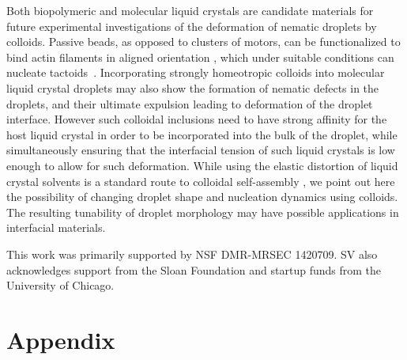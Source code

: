 \documentclass[%
 aip,
 amsmath,amssymb,
 reprint,%
]{revtex4-1}
\begin{document}
Both biopolymeric and molecular liquid crystals are candidate materials for future experimental investigations of the deformation of nematic droplets by colloids. Passive beads, as opposed to clusters of motors, can be functionalized to bind actin filaments in aligned orientation \cite{Stachowiak2012}, which under suitable conditions can nucleate tactoids~\cite{Weirich17}. Incorporating strongly homeotropic colloids into molecular liquid crystal droplets may also show the formation of nematic defects in the droplets, and their ultimate expulsion leading to deformation of the droplet interface. However such colloidal inclusions need to have strong affinity for the host liquid crystal in order to be incorporated into the bulk of the droplet, while simultaneously ensuring that the interfacial tension of such liquid crystals is low enough to allow for such deformation. While using the elastic distortion of liquid crystal solvents is a standard route to colloidal self-assembly \cite{Luo2018}, we point out here the possibility of changing droplet shape and nucleation dynamics using colloids. The resulting tunability of droplet morphology may have possible applications in interfacial materials\cite{Stebe2018}.

\begin{acknowledgments}
    This work was primarily supported by NSF DMR-MRSEC 1420709. SV also acknowledges support from the Sloan Foundation and startup funds from the University of Chicago.
\end{acknowledgments}

\section{Appendix}
\end{document}
